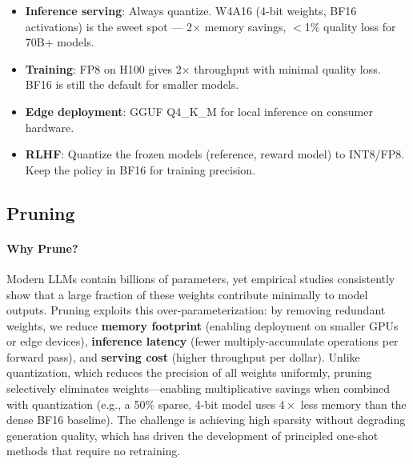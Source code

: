 \begin{intuitionbox}
\begin{itemize}
  \item \textbf{Inference serving}: Always quantize. W4A16 (4-bit weights, BF16 activations) is the sweet spot --- 2$\times$ memory savings, $<$1\% quality loss for 70B+ models.
  \item \textbf{Training}: FP8 on H100 gives 2$\times$ throughput with minimal quality loss. BF16 is still the default for smaller models.
  \item \textbf{Edge deployment}: GGUF Q4\_K\_M for local inference on consumer hardware.
  \item \textbf{RLHF}: Quantize the frozen models (reference, reward model) to INT8/FP8. Keep the policy in BF16 for training precision.
\end{itemize}
\end{intuitionbox}

\subsection{Pruning}
\label{pruning}

\paragraph{Why Prune?}
\label{why-prune}

Modern LLMs contain billions of parameters, yet empirical studies consistently show that a large fraction of these weights contribute minimally to model outputs. Pruning exploits this over-parameterization: by removing redundant weights, we reduce \textbf{memory footprint} (enabling deployment on smaller GPUs or edge devices), \textbf{inference latency} (fewer multiply-accumulate operations per forward pass), and \textbf{serving cost} (higher throughput per dollar). Unlike quantization, which reduces the precision of all weights uniformly, pruning selectively eliminates weights---enabling multiplicative savings when combined with quantization (e.g., a 50\% sparse, 4-bit model uses $4\times$ less memory than the dense BF16 baseline). The challenge is achieving high sparsity without degrading generation quality, which has driven the development of principled one-shot methods that require no retraining.

